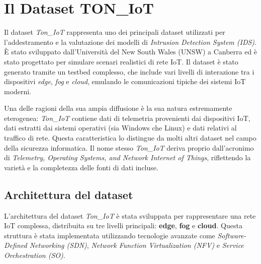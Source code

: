 \chapter{Il Dataset TON\_IoT}

Il dataset \textit{Ton\_IoT} rappresenta uno dei principali dataset utilizzati per l'addestramento e la valutazione dei modelli di \textit{Intrusion Detection System (IDS)}. È stato sviluppato dall'Università del New South Wales (UNSW) a Canberra ed è stato progettato per simulare scenari realistici di rete IoT. Il dataset è stato generato tramite un testbed complesso, che include vari livelli di interazione tra i dispositivi \textit{edge}, \textit{fog} e \textit{cloud}, emulando le comunicazioni tipiche dei sistemi IoT moderni.

Una delle ragioni della sua ampia diffusione è la sua natura estremamente eterogenea: \textit{Ton\_IoT} contiene dati di telemetria provenienti dai dispositivi IoT, dati estratti dai sistemi operativi (sia Windows che Linux) e dati relativi al traffico di rete. Questa caratteristica lo distingue da molti altri dataset nel campo della sicurezza informatica. Il nome stesso \textit{Ton\_IoT} deriva proprio dall'acronimo di \textit{Telemetry, Operating Systems, and Network Internet of Things}, riflettendo la varietà e la completezza delle fonti di dati incluse. \cite{Ton_IoT}

\section{Architettura del dataset}

L'architettura del dataset \textit{Ton\_IoT} è stata sviluppata per rappresentare una rete IoT complessa, distribuita su tre livelli principali: \textbf{edge}, \textbf{fog} e \textbf{cloud}. Questa struttura è stata implementata utilizzando tecnologie avanzate come \textit{Software-Defined Networking (SDN)}, \textit{Network Function Virtualization (NFV)} e \textit{Service Orchestration (SO)}.

